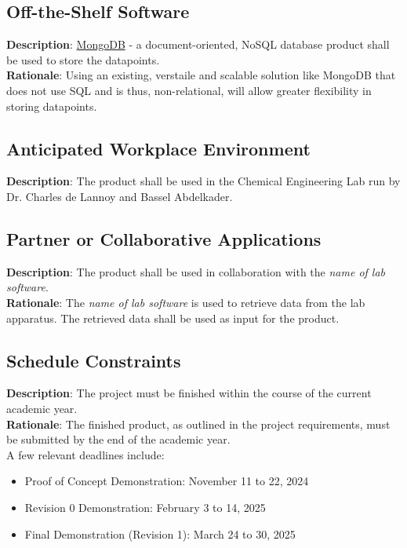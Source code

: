 \documentclass[12pt]{article}
\begin{document}
\subsection{Off-the-Shelf Software}
\textbf{Description}: \href{https://www.mongodb.com/}{MongoDB} - a document-oriented, NoSQL database product shall be used to store the datapoints.\\
\textbf{Rationale}: Using an existing, verstaile and scalable solution like MongoDB that does not use SQL and is thus, non-relational, will allow greater flexibility in storing datapoints.\\

\subsection{Anticipated Workplace Environment}
\textbf{Description}: The product shall be used in the Chemical Engineering Lab run by Dr. Charles de Lannoy and Bassel Abdelkader.

\subsection{Partner or Collaborative Applications}
\textbf{Description}: The product shall be used in collaboration with the \emph{name of lab software}.\\
\textbf{Rationale}: The \emph{name of lab software} is used to retrieve data from the lab apparatus. The retrieved data shall be used as input for the product.

\subsection{Schedule Constraints}
\textbf{Description}: The project must be finished within the course of the current academic year.\\
\textbf{Rationale}: The finished product, as outlined in the project requirements, must be submitted by the end of the academic year.\\
\newline
A few relevant deadlines include:
\begin{itemize}
  \item Proof of Concept Demonstration: November 11 to 22, 2024
  \item Revision 0 Demonstration: February 3 to 14, 2025
  \item Final Demonstration (Revision 1): March 24 to 30, 2025
\end{itemize}
\end{document}
